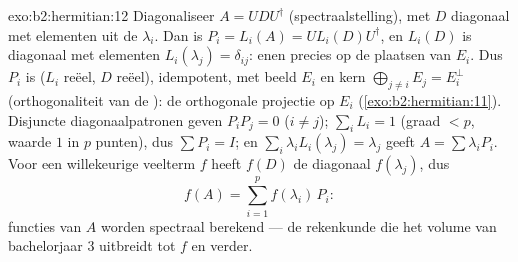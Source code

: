 \begin{solution}{exo:b2:hermitian:12}
Diagonaliseer $A = U D U^\dagger$ (spectraalstelling), met $D$
diagonaal met elementen uit de $\lambda_i$. Dan is $P_i = L_i(A) =
U L_i(D)U^\dagger$, en $L_i(D)$ is diagonaal met elementen
$L_i(\lambda_j) = \delta_{ij}$: enen precies op de plaatsen van
$E_i$. Dus $P_i$ is  ($L_i$ reëel, $D$ reëel),
idempotent, met beeld $E_i$ en kern $\bigoplus_{j\neq i}E_j =
E_i^\perp$ (orthogonaliteit van de ): de orthogonale
projectie op $E_i$ (\cref{exo:b2:hermitian:11}). Disjuncte
diagonaalpatronen geven $P_iP_j = 0$ ($i \neq j$); $\sum_i L_i = 1$
(graad $< p$, waarde $1$ in $p$ punten), dus $\sum P_i = I$; en
$\sum_i \lambda_iL_i(\lambda_j) = \lambda_j$ geeft $A = \sum
\lambda_iP_i$. Voor een willekeurige veelterm $f$ heeft $f(D)$ de
diagonaal $f(\lambda_j)$, dus
\[
f(A) = \sum_{i=1}^{p} f(\lambda_i)\,P_i :
\]
functies van $A$ worden spectraal berekend --- de rekenkunde die
het volume van bachelorjaar 3 uitbreidt tot  $f$ en verder.
\end{solution}

